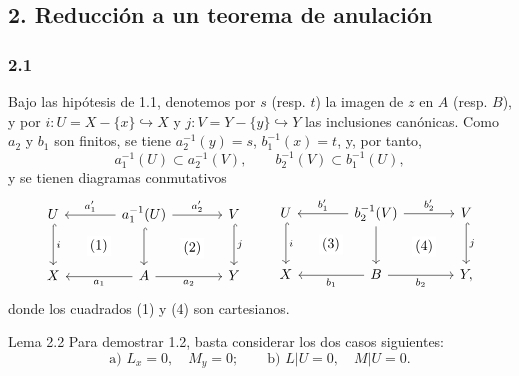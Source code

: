 \subsection*{2. Reducción a un teorema de anulación}

\subsubsection*{2.1}
Bajo las hipótesis de 1.1, denotemos por $s$ (resp. $t$) la imagen de $z$ en $A$ (resp. $B$), y por $i:U=X-\{x\}\hookrightarrow X$ y $j:V=Y-\{y\}\hookrightarrow Y$ las inclusiones canónicas. Como $a_2$ y $b_1$ son finitos, se tiene $a_2^{-1}(y)=s$, $b_1^{-1}(x)=t$, y, por tanto,
\[
a_1^{-1}(U)\subset a_2^{-1}(V),\qquad b_2^{-1}(V)\subset b_1^{-1}(U),
\]
y se tienen diagramas conmutativos
\[
\begin{tikzcd}[column sep=large,row sep=large]
U \arrow[d,hook,"i"] \arrow[rd,phantom,"(1)"{description}] & a_1^{-1}(U) \arrow[l,"a'_1"'] \arrow[r,"a'_2"] \arrow[d,hook] \arrow[rd,phantom,"(2)"{description}] & V \arrow[d,hook,"j"]\\
X & A \arrow[l,"a_1"] \arrow[r,"a_2"'] & Y
\end{tikzcd}
\qquad
\begin{tikzcd}[column sep=large,row sep=large]
U \arrow[d,hook,"i"] \arrow[rd,phantom,"(3)"{description}] & b_2^{-1}(V) \arrow[l,"b'_1"'] \arrow[r,"b'_2"] \arrow[d] \arrow[rd,phantom,"(4)"{description}] & V \arrow[d,hook,"j"]\\
X & B \arrow[l,"b_1"] \arrow[r,"b_2"'] & Y ,
\end{tikzcd}
\]
donde los cuadrados (1) y (4) son cartesianos.

\begin{statement}{Lema 2.2}
Para demostrar 1.2, basta considerar los dos casos siguientes:
\[
\text{a) } L_x=0,\quad M_y=0;\qquad
\text{b) } L|U=0,\quad M|U=0 .
\]
\end{statement}

